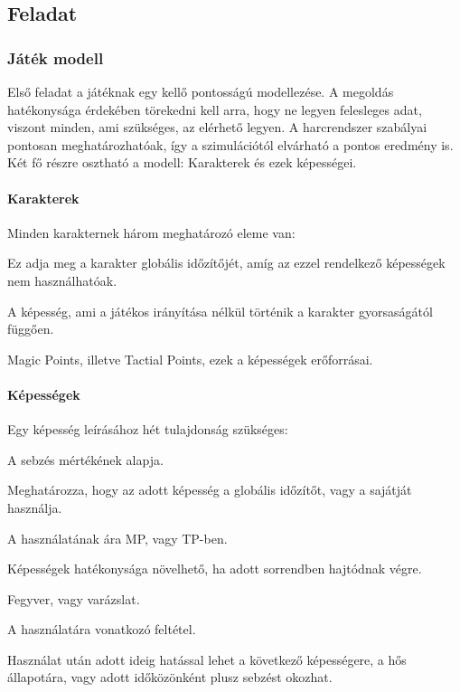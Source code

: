 \documentclass[12pt]{article}
\begin{document}
	\subsection{Feladat}
	
	\subsubsection{Játék modell}
	
	Első feladat a játéknak egy kellő pontosságú modellezése. A megoldás hatékonysága érdekében törekedni kell arra, hogy ne legyen felesleges adat, viszont minden, ami szükséges, az elérhető legyen. 
	A harcrendszer szabályai pontosan meghatározhatóak, így a szimulációtól elvárható a pontos eredmény is. 
	Két fő részre osztható a modell: Karakterek és ezek képességei.
	
	\paragraph{Karakterek}
	
	Minden karakternek három meghatározó eleme van:
	
	\begin{description}[align=right,labelwidth=3cm]
		\item [Gyorsaság] Ez adja meg a karakter globális időzítőjét, amíg az ezzel rendelkező képességek nem használhatóak. 
		\item [Támadás] A képesség, ami a játékos irányítása nélkül történik a karakter gyorsaságától függően.
		\item [MP/TP] Magic Points, illetve Tactial Points, ezek a képességek erőforrásai.
	\end{description}
	
	\paragraph{Képességek}
	
	Egy képesség leírásához hét tulajdonság szükséges:
	
	\begin{description}[align=right,labelwidth=3cm]
		\item [Potenciál] A sebzés mértékének alapja.
		\item [Időzítő] Meghatározza, hogy az adott képesség a globális időzítőt, vagy a sajátját használja.
		\item [Erőforrás] A használatának ára MP, vagy TP-ben.
		\item [Combo] Képességek hatékonysága növelhető, ha adott sorrendben hajtódnak végre.
		\item [Típus] Fegyver, vagy varázslat.
		\item [Feltétel] A használatára vonatkozó feltétel.
		\item [Hatás] Használat után adott ideig hatással lehet a következő képességere, a hős állapotára, vagy adott időközönként plusz sebzést okozhat.
	\end{description}
	
\end{document}
